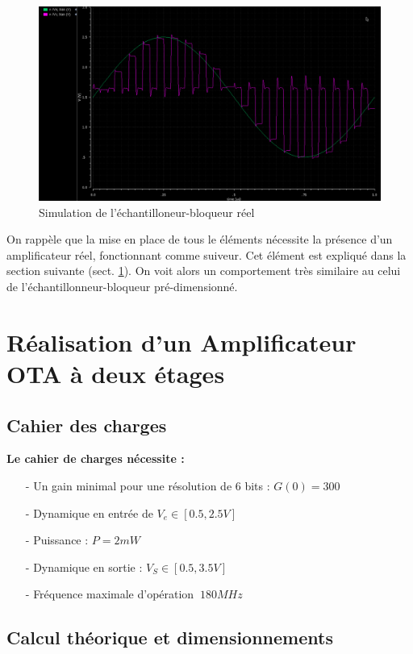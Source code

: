 \documentclass[11pt]{article}
\begin{document}
\begin{figure}[!htb]
\begin{center}
  \includegraphics[width=0.80\linewidth]{simu_ech_bloqueur_reel.png}
  \caption{Simulation de l'\'echantilloneur-bloqueur r\'eel}
\end{center}
\end{figure}

On rapp\`ele que la mise en place de tous le \'el\'ements n\'ecessite la pr\'esence d'un amplificateur
r\'eel, fonctionnant comme suiveur. Cet \'el\'ement est expliqu\'e dans la section suivante (sect. \ref{OTA_sect}). On voit alors un comportement tr\`es similaire au celui de l'\'echantillonneur-bloqueur pr\'e-dimensionn\'e.

\clearpage
\section{R\'ealisation d'un Amplificateur OTA \`a deux \'etages}\label{OTA_sect}

\subsection{Cahier des charges}

\textbf{Le cahier de charges n\'ecessite :}
\begin{itemize} \itemsep -4pt
  \item[-] Un gain minimal pour une r\'esolution de 6 bits : $G(0) = 300$
  \item[-] Dynamique en entr\'ee de $V_e \in [0.5, 2.5 V]$
  \item[-] Puissance : $P = 2mW$
  \item[-] Dynamique en sortie : $V_S \in [0.5, 3.5 V]$
    \item[-] Fr\'equence maximale d'op\'eration $~ 180 MHz$
\end{itemize}

\subsection{Calcul th\'eorique et dimensionnements}
\end{document}
